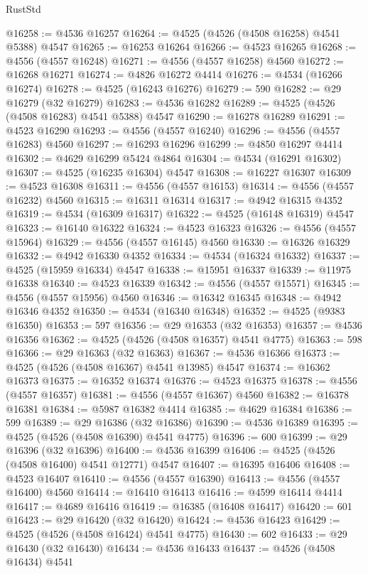 \begin{lexlean}{RustStd}
\begin{coremodule}
@16258 := @4536 @16257
@16264 := @4525 (@4526 (@4508 @16258) @4541 @5388) @4547
@16265 := @16253 @16264
@16266 := @4523 @16265
@16268 := @4556 (@4557 @16248)
@16271 := @4556 (@4557 @16258) @4560
@16272 := @16268 @16271
@16274 := @4826 @16272 @4414
@16276 := @4534 (@16266 @16274)
@16278 := @4525 (@16243 @16276)
@16279 := 590
@16282 := @29 @16279 (@32 @16279)
@16283 := @4536 @16282
@16289 := @4525 (@4526 (@4508 @16283) @4541 @5388) @4547
@16290 := @16278 @16289
@16291 := @4523 @16290
@16293 := @4556 (@4557 @16240)
@16296 := @4556 (@4557 @16283) @4560
@16297 := @16293 @16296
@16299 := @4850 @16297 @4414
@16302 := @4629 @16299 @5424 @4864
@16304 := @4534 (@16291 @16302)
@16307 := @4525 (@16235 @16304) @4547
@16308 := @16227 @16307
@16309 := @4523 @16308
@16311 := @4556 (@4557 @16153)
@16314 := @4556 (@4557 @16232) @4560
@16315 := @16311 @16314
@16317 := @4942 @16315 @4352
@16319 := @4534 (@16309 @16317)
@16322 := @4525 (@16148 @16319) @4547
@16323 := @16140 @16322
@16324 := @4523 @16323
@16326 := @4556 (@4557 @15964)
@16329 := @4556 (@4557 @16145) @4560
@16330 := @16326 @16329
@16332 := @4942 @16330 @4352
@16334 := @4534 (@16324 @16332)
@16337 := @4525 (@15959 @16334) @4547
@16338 := @15951 @16337
@16339 := @11975 @16338
@16340 := @4523 @16339
@16342 := @4556 (@4557 @15571)
@16345 := @4556 (@4557 @15956) @4560
@16346 := @16342 @16345
@16348 := @4942 @16346 @4352
@16350 := @4534 (@16340 @16348)
@16352 := @4525 (@9383 @16350)
@16353 := 597
@16356 := @29 @16353 (@32 @16353)
@16357 := @4536 @16356
@16362 := @4525 (@4526 (@4508 @16357) @4541 @4775)
@16363 := 598
@16366 := @29 @16363 (@32 @16363)
@16367 := @4536 @16366
@16373 := @4525 (@4526 (@4508 @16367) @4541 @13985) @4547
@16374 := @16362 @16373
@16375 := @16352 @16374
@16376 := @4523 @16375
@16378 := @4556 (@4557 @16357)
@16381 := @4556 (@4557 @16367) @4560
@16382 := @16378 @16381
@16384 := @5987 @16382 @4414
@16385 := @4629 @16384
@16386 := 599
@16389 := @29 @16386 (@32 @16386)
@16390 := @4536 @16389
@16395 := @4525 (@4526 (@4508 @16390) @4541 @4775)
@16396 := 600
@16399 := @29 @16396 (@32 @16396)
@16400 := @4536 @16399
@16406 := @4525 (@4526 (@4508 @16400) @4541 @12771) @4547
@16407 := @16395 @16406
@16408 := @4523 @16407
@16410 := @4556 (@4557 @16390)
@16413 := @4556 (@4557 @16400) @4560
@16414 := @16410 @16413
@16416 := @4599 @16414 @4414
@16417 := @4689 @16416
@16419 := @16385 (@16408 @16417)
@16420 := 601
@16423 := @29 @16420 (@32 @16420)
@16424 := @4536 @16423
@16429 := @4525 (@4526 (@4508 @16424) @4541 @4775)
@16430 := 602
@16433 := @29 @16430 (@32 @16430)
@16434 := @4536 @16433
@16437 := @4526 (@4508 @16434) @4541

\end{coremodule}
\end{lexlean}
